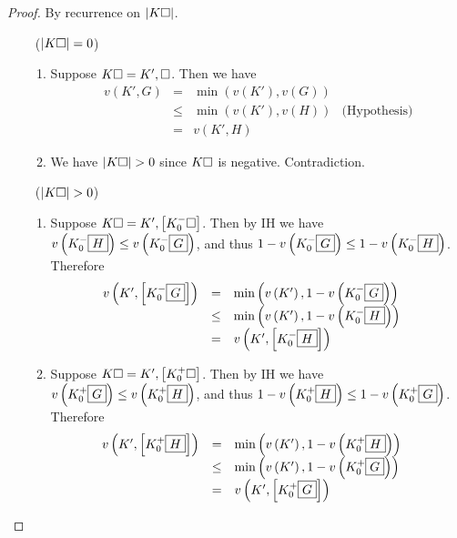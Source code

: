 \begin{proof}
  By recurrence on $\left|K\square\right|$.

  \def\arraystretch{1.5}
  \begin{itemize}
    \item[\bcase~($\left|K\square\right| = 0$)]\sbr
      \begin{enumerate}
        \item Suppose $K\square = K', \square$. Then we have
        $$
        \begin{array}{rcll}
          v(K', G)
          &=& \min(v(K'), v(G)) & \\
          &\leq& \min(v(K'), v(H)) &\text{(Hypothesis)} \\
          &=& v(K', H) &
        \end{array}
        $$

        \item We have $\left|K\square\right| > 0$ since $K\square$ is negative.
        Contradiction.
      \end{enumerate}
    \item[\rcase~($\left|K\square\right| > 0$)]\sbr
      \begin{enumerate}
        \item Suppose $K\square = K', \left[K_0^-\square\right]$. Then by IH we have
        $v\left(K_0^-\fbox{$H$}\right) \leq v\left(K_0^-\fbox{$G$}\right)$, and thus
        $1 - v\left(K_0^-\fbox{$G$}\right) \leq 1 - v\left(K_0^-\fbox{$H$}\right)$. Therefore
        $$
        \begin{array}{rcll}
          v\left(K', \left[K_0^-\fbox{$G$}\right]\right)
          &=& \min\left(v\left(K'\right), 1 - v\left(K_0^-\fbox{$G$}\right)\right) & \\
          &\leq& \min\left(v\left(K'\right), 1 - v\left(K_0^-\fbox{$H$}\right)\right) & \\
          &=& v\left(K', \left[K_0^-\fbox{$H$}\right]\right) &
        \end{array}
        $$

        \item Suppose $K\square = K', \left[K_0^+\square\right]$. Then by IH we have
        $v\left(K_0^+\fbox{$G$}\right) \leq v\left(K_0^+\fbox{$H$}\right)$, and thus
        $1 - v\left(K_0^+\fbox{$H$}\right) \leq 1 - v\left(K_0^+\fbox{$G$}\right)$. Therefore
        $$
        \begin{array}{rcll}
          v\left(K', \left[K_0^+\fbox{$H$}\right]\right)
          &=& \min\left(v\left(K'\right), 1 - v\left(K_0^+\fbox{$H$}\right)\right) & \\
          &\leq& \min\left(v\left(K'\right), 1 - v\left(K_0^+\fbox{$G$}\right)\right) & \\
          &=& v\left(K', \left[K_0^+\fbox{$G$}\right]\right) &
        \end{array}
        $$
      \end{enumerate}
  \end{itemize}
\end{proof}

